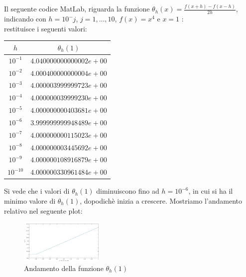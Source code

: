 Il seguente codice MatLab, riguarda la funzione $\theta_{h}(x) = \frac{f(x+h)-f(x-h)}{2h}$, indicando con $h=10^-j$, $j=1,...,10$, $f(x)=x^4$ e $x=1$ :\\
	
restituisce i seguenti valori:\\
\begin{center}
	\begin{tabular}{|c|c|}
		\hline
			$h$ & $\theta_{h}(1)$  \\
		\hline
    		\(10^{-1}\) & $4.040000000000002e+00$\\
    		\(10^{-2}\) & $4.000400000000004e+00$\\
    		\(10^{-3}\) & $4.000003999999723e+00$\\
    		\(10^{-4}\) & $4.000000039999230e+00$\\
    		\(10^{-5}\) & $4.000000000403681e+00$\\
    		\(10^{-6}\) & $3.999999999948489e+00$\\
    		\(10^{-7}\) & $4.000000000115023e+00$\\
    		\(10^{-8}\) & $4.000000003445692e+00$\\
    		\(10^{-9}\) & $4.000000108916879e+00$\\
    		\(10^{-10}\) & $4.000000330961484e+00$\\
		\hline
	\end{tabular}
\end{center} 
Si vede che i valori di $\theta_{h}(1)$ diminuiscono fino ad $h = 10^{-6}$, in cui si ha il minimo valore di $\theta_{h}(1)$, dopodichè inizia a crescere. Mostriamo l'andamento relativo nel seguente plot:
\begin{figure}[H]
	\label{Cap_1_Es_3}
	\includegraphics[left, width=150px]{Plot/Cap_1_Es_3}
		\caption{Andamento della funzione $\theta_{h}(1)$}
\end{figure}